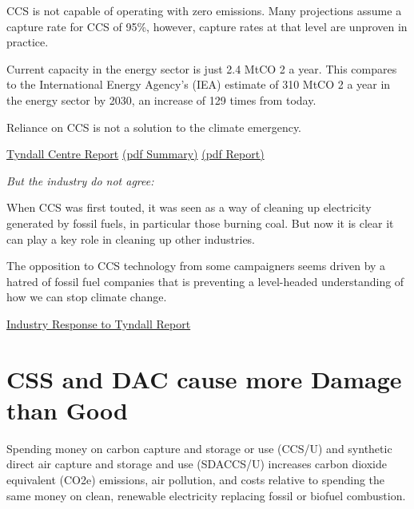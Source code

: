 \documentclass[
]{book}
\begin{document}
CCS is not capable of operating with zero emissions.
Many projections assume a capture rate for CCS of 95\%, however,
capture rates at that level are unproven in practice.

Current capacity in the energy sector is just 2.4 MtCO 2 a year.
This compares to the International Energy Agency's (IEA) estimate of 310 MtCO 2 a year in the
energy sector by 2030, an increase of 129 times from today.

Reliance on CCS is not a solution to the climate emergency.

\href{https://foe.scot/resource/report-carbon-capture-storage-energy-role/}{Tyndall Centre Report}
\href{pdf/Tyndall_2020_CCS-Summary.pdf}{(pdf Summary)}
\href{pdf/Tyndall_2020_CCS-Report.pdf}{(pdf Report)}

\emph{But the industry do not agree:}

When CCS was first touted, it was seen as a way of cleaning up
electricity generated by fossil fuels, in particular those burning coal.
But now it is clear it can play a key role in cleaning up other industries.

The opposition to CCS technology from some campaigners seems
driven by a hatred of fossil fuel companies that is
preventing a level-headed understanding of how we can stop climate change.

\href{https://www.theguardian.com/environment/2021/jan/16/carbon-capture-vital-meeting-climate-goals-scientists-cut-emissions}{Industry Response to Tyndall Report}

\hypertarget{css-and-dac-cause-more-damage-than-good}{%
\section{CSS and DAC cause more Damage than Good}\label{css-and-dac-cause-more-damage-than-good}}

Spending money on carbon capture and storage or use (CCS/U) and synthetic direct air capture and storage and use (SDACCS/U) increases carbon dioxide equivalent (CO2e) emissions, air pollution, and costs relative to spending the same money on clean, renewable electricity replacing fossil or biofuel combustion.
\end{document}
